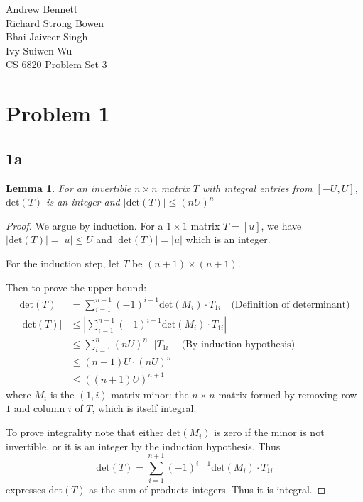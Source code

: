 \documentclass{article}
\newtheorem{lemma}{Lemma}
\begin{document}
\begin{flushright}
Andrew Bennett\\
Richard Strong Bowen\\
Bhai Jaiveer Singh\\
Ivy Suiwen Wu\\
CS 6820 Problem Set 3
\end{flushright}
\section*{Problem 1}
\subsection*{1a}
\begin{lemma}
For an invertible $n\times n$ matrix $T$ with integral entries from $[-U, U]$,
$\text{det}(T)$ is an integer and $|\text{det}(T)| \leq (nU)^n$
\end{lemma}
\begin{proof}
We argue by induction. For a $1\times 1$ matrix $T = [u]$, we have
$|\text{det}(T)|= |u|\leq U$ and $|\text{det}(T)| = |u|$ which is an integer.
       
For the induction step, let $T$ be $(n+1)\times (n+1)$.
       
Then to prove the upper bound:
\begin{align*}
	\text{det}(T) &= \sum_{i=1}^{n+1} (-1)^{i-1}\text{det}(M_i)\cdot T_{1i} \quad \text{(Definition of determinant)}\\
	\left |\text{det}(T)\right |&\leq \left |\sum_{i=1}^{n+1} (-1)^{i-1}\text{det}(M_i)\cdot T_{1i}\right|\\
	&\leq \sum_{i=1}^{n}(nU)^{n}\cdot |T_{1i}|\quad \text{(By induction hypothesis)}\\
&\leq(n+1)U\cdot (nU)^{n}\\
&\leq ((n+1)U)^{n+1}
\end{align*}
where $M_i$ is the $(1,i)$ matrix minor: the $n\times n$ matrix formed by removing row $1$ and column $i$ of $T$, which is itself integral.

To prove integrality note that either $\text{det}(M_i)$ is zero if the minor is not invertible, or it is an integer by the induction hypothesis. Thus
\[\text{det}(T) = \sum_{i=1}^{n+1} (-1)^{i-1}\text{det}(M_i)\cdot T_{1i}\]
expresses $\text{det}(T)$ as the sum of products integers. Thus it is integral.

\end{proof}
\end{document}

